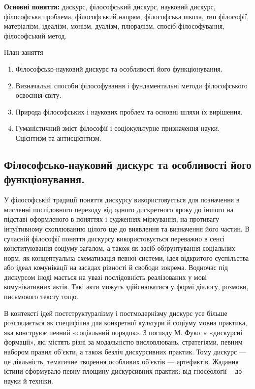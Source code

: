 \textbf{Основні поняття:} дискурс, філософський дискурс, науковий дискурс,
філософська проблема, філософський напрям, філософська школа, тип
філософії, матеріалізм, ідеалізм, монізм, дуалізм, плюралізм, спосіб
філософування, філософський метод.

План заняття
\begin{enumerate}
	\item Філософсько-науковий дискурс та особливості його функціонування.
	
	\item Визначальні способи філософування і фундаментальні методи
	філософського ос\-воєння світу.
	
	\item Природа філософських і наукових проблем та основні шляхи їх
	вирішення.

	\item Гуманістичний зміст філософії і соціокультурне призначення науки.
	Сцієнтизм та антисцієнтизм.
\end{enumerate}

\subsection[Філософсько-науковий дискурс]{Філософсько-науковий дискурс та особливості його функціонування.}
У філософській традиції поняття дискурсу використовується для позначення в
мисленні послідовного переходу від одного дискретного кроку до іншого на
підставі офор\-мленого в поняттях і судженнях міркування, на противагу
інтуїтивному схоплюванню цілого ще до виявлення та визначення його частин.
В сучасній філософії поняття дискурсу використовується переважно в сенсі
конституювання соціуму загалом, а також як засіб обґрунтування соціальних
норм, як концептуальна схематизація певної системи, ідея відкритого
суспільства або ідеал комунікації на засадах рівності й свободи зокрема.
Водночас під дискурсом іноді мається на увазі послідовність реалізованих у
мові комунікативних актів. Такі акти можуть здійснюватися у формі діалогу,
розмови, письмового тексту тощо.

В контексті ідей постструктуралізму і постмодернізму дискурс усе більше
розглядається як специфічна для конкретної культури й соціуму мовна
практика, яка конструює певний «соціальний порядок». З погляду М. Фуко, є
«дискурсні формації», які містять різні за модальністю висловлювань,
стратегіями, певним набором правил об’єкти, а також безліч дискурсивних
практик. Тому дискурс --- це діяльність, тематичне творення особливих об’єктів
--- артефактів. Жадання істини сформувало певну площину дискурсивних
практик: від гносеології – до науки й техніки.

